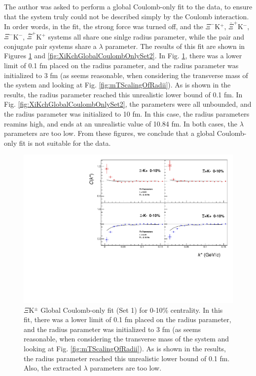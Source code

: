 \documentclass[../AnalysisNoteJBuxton.tex]{subfiles}
\begin{document}
The author was asked to perform a global Coulomb-only fit to the data, to ensure that the system truly could not be described simply by the Coulomb interaction.  In order words, in the fit, the strong force was turned off, and the $\Xi^{-}$K$^{+}$, $\bar{\Xi}^{+}$K$^{-}$, $\Xi^{-}$K$^{-}$, $\bar{\Xi}^{+}$K$^{+}$ systems all share one sinlge radius parameter, while the pair and conjugate pair systems share a $\lambda$ parameter.  The results of this fit are shown in Figures \ref{fig:XiKchGlobalCoulombOnlySet1} and \ref{fig:XiKchGlobalCoulombOnlySet2}.  In Fig. \ref{fig:XiKchGlobalCoulombOnlySet1}, there was a lower limit of 0.1 fm placed on the radius parameter, and the radius parameter was initialized to 3 fm (as seems reasonable, when considering the transverse mass of the system and looking at Fig. \ref{fig:mTScalingOfRadii}).  As is shown in the results, the radius parameter reached this unrealistic lower bound of 0.1 fm.  In Fig. \ref{fig:XiKchGlobalCoulombOnlySet2}, the parameters were all unbounded, and the radius parameter was initialized to 10 fm.  In this case, the radius parameters reamins high, and ends at an unrealistic value of 10.84 fm.  In both cases, the $\lambda$ parameters are too low.  From these figures, we conclude that a global Coulomb-only fit is not suitable for the data.

\begin{figure}[h]
  \centering
  \includegraphics[width=\textwidth]{7_ResultsAndDiscussion/Figures/GlobalCoulombOnlyFit_Set1.pdf}
  \caption[$\Xi$K$^{\pm}$ Global Coulomb-Only Fit (Set 1)]{$\Xi$K$^{\pm}$ Global Coulomb-only fit (Set 1) for 0-10\% centrality.  In this fit, there was a lower limit of 0.1 fm placed on the radius parameter, and the radius parameter was initialized to 3 fm (as seems reasonable, when considering the transverse mass of the system and looking at Fig. \ref{fig:mTScalingOfRadii}).  As is shown in the results, the radius parameter reached this unrealistic lower bound of 0.1 fm.  Also, the extracted $\lambda$ parameters are too low.}
  \label{fig:XiKchGlobalCoulombOnlySet1}
\end{figure}
\end{document}
